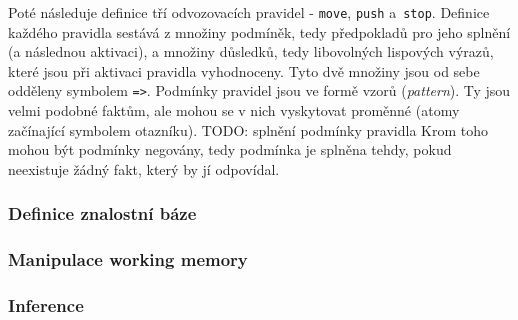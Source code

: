 Poté následuje definice tří odvozovacích pravidel - \verb|move|, \verb|push|
a~\verb|stop|. Definice každého pravidla sestává z množiny podmíněk, tedy
předpokladů pro jeho splnění (a následnou aktivaci), a množiny důsledků, tedy
libovolných lispových výrazů, které jsou při aktivaci pravidla vyhodnoceny.
Tyto dvě množiny jsou od sebe odděleny symbolem \verb|=>|. Podmínky pravidel
jsou ve formě vzorů (\emph{pattern}). Ty jsou velmi podobné faktům, ale mohou se
v nich vyskytovat proměnné (atomy začínající symbolem otazníku).
TODO: splnění podmínky pravidla
Krom toho mohou
být podmínky negovány, tedy podmínka je splněna tehdy, pokud neexistuje žádný
fakt, který by jí odpovídal.

\subsubsection{Definice znalostní báze}

\subsubsection{Manipulace working memory}

\subsubsection{Inference}














